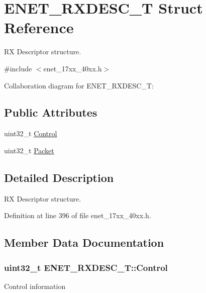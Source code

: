 \hypertarget{structENET__RXDESC__T}{}\section{E\+N\+E\+T\+\_\+\+R\+X\+D\+E\+S\+C\+\_\+T Struct Reference}
\label{structENET__RXDESC__T}


RX Descriptor structure.  




{\ttfamily \#include $<$enet\+\_\+17xx\+\_\+40xx.\+h$>$}



Collaboration diagram for E\+N\+E\+T\+\_\+\+R\+X\+D\+E\+S\+C\+\_\+T\+:
\subsection*{Public Attributes}
\begin{DoxyCompactItemize}
\item 
uint32\+\_\+t \hyperlink{structENET__RXDESC__T_a4e7065600418654b06d854ea66dfe259}{Control}
\item 
uint32\+\_\+t \hyperlink{structENET__RXDESC__T_a6fffb262a03d26e426701e6fba82a7ff}{Packet}
\end{DoxyCompactItemize}


\subsection{Detailed Description}
RX Descriptor structure. 

Definition at line 396 of file enet\+\_\+17xx\+\_\+40xx.\+h.



\subsection{Member Data Documentation}
\subsubsection[{\texorpdfstring{Control}{Control}}]{\setlength{\rightskip}{0pt plus 5cm}uint32\+\_\+t E\+N\+E\+T\+\_\+\+R\+X\+D\+E\+S\+C\+\_\+\+T\+::\+Control}\hypertarget{structENET__RXDESC__T_a4e7065600418654b06d854ea66dfe259}{}\label{structENET__RXDESC__T_a4e7065600418654b06d854ea66dfe259}
Control information 

